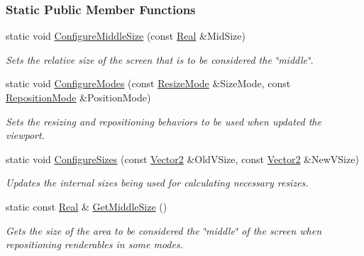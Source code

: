 \subsubsection*{Static Public Member Functions}
\begin{DoxyCompactItemize}
\item 
static void \hyperlink{classMezzanine_1_1UI_1_1ViewportUpdateTool_aae7cbe7f6979df892e57b1b9d8b5f5d3}{ConfigureMiddleSize} (const \hyperlink{namespaceMezzanine_a726731b1a7df72bf3583e4a97282c6f6}{Real} \&MidSize)
\begin{DoxyCompactList}\small\item\em Sets the relative size of the screen that is to be considered the \char`\"{}middle\char`\"{}. \item\end{DoxyCompactList}\item 
static void \hyperlink{classMezzanine_1_1UI_1_1ViewportUpdateTool_a86deabaafebcfdfc6925423544e2f311}{ConfigureModes} (const \hyperlink{classMezzanine_1_1UI_1_1ViewportUpdateTool_a89afdf79f52d5bf18bdffd323911a549}{ResizeMode} \&SizeMode, const \hyperlink{classMezzanine_1_1UI_1_1ViewportUpdateTool_ad2de82a6fc57859d914845ce676ff67e}{RepositionMode} \&PositionMode)
\begin{DoxyCompactList}\small\item\em Sets the resizing and repositioning behaviors to be used when updated the viewport. \item\end{DoxyCompactList}\item 
static void \hyperlink{classMezzanine_1_1UI_1_1ViewportUpdateTool_a75bbcaf494a69d0c5fe9351916d9598a}{ConfigureSizes} (const \hyperlink{classMezzanine_1_1Vector2}{Vector2} \&OldVSize, const \hyperlink{classMezzanine_1_1Vector2}{Vector2} \&NewVSize)
\begin{DoxyCompactList}\small\item\em Updates the internal sizes being used for calculating necessary resizes. \item\end{DoxyCompactList}\item 
static const \hyperlink{namespaceMezzanine_a726731b1a7df72bf3583e4a97282c6f6}{Real} \& \hyperlink{classMezzanine_1_1UI_1_1ViewportUpdateTool_a2b78d084eb6e5d91f6723fd124b10183}{GetMiddleSize} ()
\begin{DoxyCompactList}\small\item\em Gets the size of the area to be considered the \char`\"{}middle\char`\"{} of the screen when repositioning renderables in some modes. \item\end{DoxyCompactList}\item 

\end{DoxyCompactItemize}
